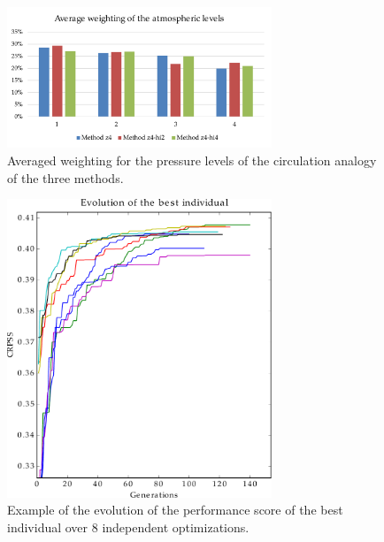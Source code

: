\documentclass[twocol]{ametsoc}
\begin{document}
\begin{figure}[htb]
	\centerline{\includegraphics[width=7.9cm]{figures/figure_levels_weights_average.pdf}}
	\caption{Averaged weighting for the pressure levels of the circulation analogy of the three methods.}
	\label{fig:levels_weights_average}
\end{figure}

\begin{figure}[htb]
	\centerline{\includegraphics[width=7.9cm]{figures/figure_evolution.pdf}}
	\caption{Example of the evolution of the performance score of the best individual over 8 independent optimizations.}
	\label{fig:evolution}
\end{figure}
\end{document}
